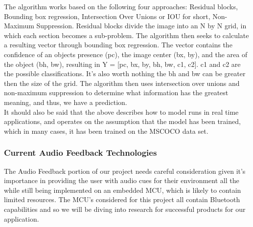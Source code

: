 \noindent The algorithm works based on the following four approaches: Residual blocks, Bounding box regression, Intersection Over Unions or IOU for short, Non-Maximum Suppression. Residual blocks divide the image into an N by N grid, in which each section becomes a sub-problem. The algorithm then seeks to calculate a resulting vector through bounding box regression. The vector contains the confidence of an objects presence (pc), the image center (bx, by), and the area of the object (bh, bw), resulting in Y = [pc, bx, by, bh, bw, c1, c2]. c1 and c2 are the possible classifications. It's also worth nothing the bh and bw can be greater then the size of the grid. The algorithm then uses intersection over unions and non-maximum suppression to determine what information has the greatest meaning, and thus, we have a prediction. \\

\noindent It should also be said that the above describes how to model runs in real time applications, and operates on the assumption that the model has been trained, which in many cases, it has been trained on the MSCOCO data set. \\

\subsubsection{Current Audio Feedback Technologies}
\noindent The Audio Feedback portion of our project needs careful consideration given it's importance in providing the user with audio cues for their environment all the while still being implemented on an embedded MCU, which is likely to contain limited resources. The MCU's considered for this project all contain Bluetooth capabilities and so we will be diving into research for successful products for our application. \\

